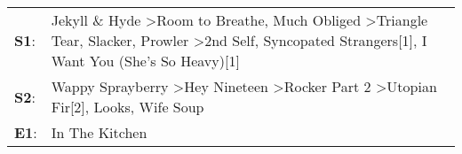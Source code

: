 \begin{supertabular}{p{0.03\textwidth}p{0.92\textwidth}}
 \textbf{S1}:  &  Jekyll \& Hyde\textsuperscript{} \textgreater \enspace Room to Breathe\textsuperscript{}, \enspace Much Obliged\textsuperscript{} \textgreater \enspace Triangle Tear\textsuperscript{}, \enspace Slacker\textsuperscript{}, \enspace Prowler\textsuperscript{} \textgreater \enspace 2nd Self\textsuperscript{}, \enspace Syncopated Strangers[1]\textsuperscript{}, \enspace I Want You (She's So Heavy)[1]\textsuperscript{}  \enspace  \\
 \textbf{S2}:  &                                                                                                                                                     Wappy Sprayberry\textsuperscript{} \textgreater \enspace Hey Nineteen\textsuperscript{} \textgreater \enspace Rocker Part 2\textsuperscript{} \textgreater \enspace Utopian Fir[2]\textsuperscript{}, \enspace Looks\textsuperscript{}, \enspace Wife Soup\textsuperscript{}  \enspace  \\
 \textbf{E1}:  &                                                                                                                                                                                                                                                                                                                                                                                                 In The Kitchen\textsuperscript{}  \enspace  \\
\end{supertabular}
